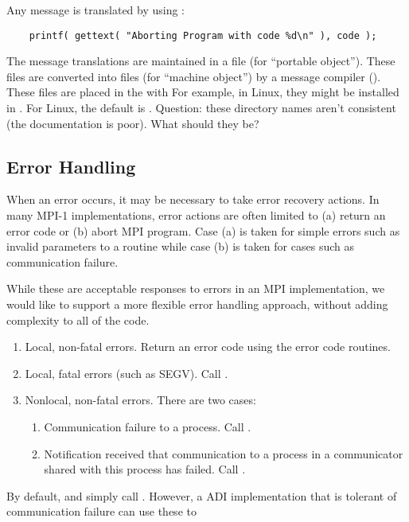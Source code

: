 \documentclass{article}
\begin{document}
Any message is translated by using :
\begin{verbatim}
    printf( gettext( "Aborting Program with code %d\n" ), code );
\end{verbatim}
The message translations are maintained in a  file (for ``portable
object'').  These files are converted into  files (for ``machine
object'') by a message compiler ().  These files are placed in
the  with 
For example, in Linux, they might be installed in
.   For Linux, the default
 is .  
Question: these directory names aren't consistent (the documentation is
poor).  What should they be?

\subsection{Error Handling}
\label{sec:error-handling}

When an error occurs, it may be necessary to take error recovery
actions.  In many MPI-1 implementations, error actions are often
limited to (a) return an error code or (b) abort MPI program.
Case (a) is taken for simple errors such as invalid parameters to a
routine while case (b) is taken for cases such as communication
failure.  

While these are acceptable responses to errors in an MPI
implementation, we would like to support a more flexible error
handling approach, without adding complexity to all of the code.
\begin{enumerate}
\item Local, non-fatal errors.  Return an error code using the error
code routines.
\item Local, fatal errors (such as SEGV).  Call .
\item Nonlocal, non-fatal errors.  There are two cases:
   \begin{enumerate}
   \item Communication failure to a process.  Call
       .
   \item Notification received that communication to a process in a 
       communicator shared with this process has failed.  Call 
       .
   \end{enumerate}
\end{enumerate}
By default,  and  simply
call .  However, a ADI implementation that is
tolerant of communication failure can use these to 
\end{document}
